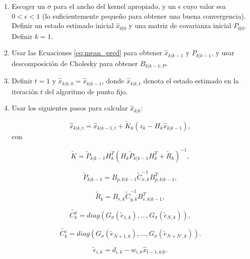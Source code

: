 \begin{enumerate}
\item Escoger un $\sigma$ para el ancho del kernel apropiado, y un $\epsilon$ cuyo valor sea $0 < \epsilon < 1$ (lo suficientemente peque\~no para obtener una buena convergencia). Definir un estado estimado inicial $\hat{x}_{0|0}$ y una matriz de covarianza inicial $P_{0|0}$. Definir $k=1$.
\item Usar las Ecuaciones \ref{eq:mean_pred} para obtener $\hat{x}_{k|k-1}$ y $P_{k|k-1}$, y usar descomposici\'on de Cholesky para obtener $B_{k|k-1;P}$.
\item Definir $t=1$ y $\hat{x}_{k|k,0} = \hat{x}_{k|k-1}$, donde $\hat{x}_{k|k,t}$ denota el estado estimado en la iteraci\'on $t$ del algoritmo de punto fijo.
\item Usar los siguientes pasos para calcular $\hat{x}_{k|k}$:

\begin{equation}
\hat{x}_{k|k,t} = \hat{x}_{k|k-1,t} + \tilde{K}_k (z_k - H_k \hat{x}_{k|k-1}),
\end{equation}
con 

\begin{equation}
\tilde{K} = \tilde{P}_{k|k-1} H_k^T (H_k \tilde{P}_{k|k-1} H_k^T + \tilde{R}_k)^{-1}, 
\label{eq:eq14}
\end{equation}

\begin{equation}
\tilde{P}_{k|k-1} = B_{p, k|k-1} \tilde{C}_{x, k}^{-1}B_{p, k|k-1}^T,
\label{eq:eq13}
\end{equation}

\begin{equation}
\tilde{R}_k = B_{r, k} \tilde{C}_{y, k}^{-1}B_{r, k|k-1}^T,
\label{eq:eq12}
\end{equation}

\begin{equation}
\tilde{C^{x}_{k}}= diag(G_{\sigma}(\tilde{e}_{1, k}),..., G_{\sigma}(\tilde{e}_{N, k})),
\label{eq:eq10}
\end{equation}

\begin{equation}
\tilde{C^{z}_{k}}= diag(G_{\sigma}(\tilde{e}_{N+1, k}),..., G_{\sigma}(\tilde{e}_{N+N', k})).
\label{eq:eq11}
\end{equation}


\begin{equation}
\tilde{e}_{i,k} = d_{i,k} - w_{i,k} \hat{x}_{t-1, k|k}.
\label{eq:eq9}
\end{equation}


\end{enumerate}
